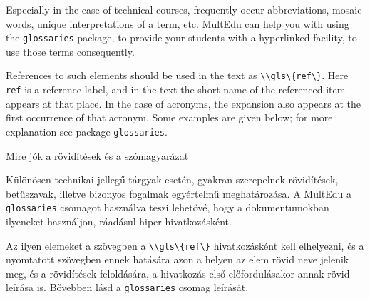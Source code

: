 {
Especially in the case of technical courses, frequently occur abbreviations, mosaic words, unique interpretations of a term, etc. MultEdu can help you
with using the \lstinline|glossaries| package, to provide your students 
with a hyperlinked facility, to use those terms consequently.

References to such elements should be used in the text as \lstinline|\\gls\{ref\}|.
Here \lstinline|ref| is a reference label, and in the text the short 
name of the referenced item appears at that place. In the case of acronyms, the 
expansion also appears at the first occurrence of that acronym.
Some examples are given below; for more explanation see package \lstinline|glossaries|.
}
{Mire jók a rövidítések és a szómagyarázat}
{

Különösen technikai jellegű tárgyak esetén, gyakran szerepelnek 
rövidítések, betűszavak, illetve bizonyos fogalmak egyértelmű meghatározása.
A MultEdu a \lstinline|glossaries| csomagot használva teszi lehetővé,
hogy a dokumentumokban ilyeneket használjon, ráadásul hiper-hivatkozásként.
 
Az ilyen elemeket a szövegben  a \lstinline|\\gls\{ref\}| hivatkozásként kell elhelyezni,
és a nyomtatott szövegben ennek hatására azon a helyen az elem rövid neve jelenik meg, és a rövidítések feloldására, a hivatkozás első
előfordulásakor annak rövid leírása is. Bővebben lásd a \lstinline|glossaries| 
csomag leírását.
}


